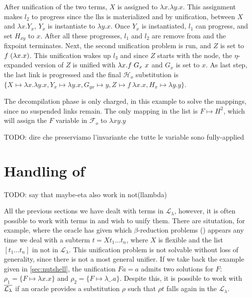 \documentclass[sigconf,natbib=false,review]{acmart}
\newcommand{\appsep}{\ensuremath{\textcolor{lightgray}{\cdot}}}
\newcommand{\llambda}{\ensuremath{\mathcal{L}_\lambda}\xspace}
\newcommand{\Fo}{\ensuremath{\mathcal{F}_{\!o}\xspace}} %
\newcommand{\Ho}{\ensuremath{\mathcal{H}_o}\xspace}
\newcommand{\mapping}[3]{\ensuremath{#1 \mapsto #2^#3}}
\newcommand{\lhs}{\ensuremath{\mathrm{lhs}}\xspace}
\begin{document}
After unification of the two terms, $X$ is assigned to $\lambda x.\lambda y.x$.
This assignment makes $l_2$ to progress since the \lhs is materialized and by
unification, between $X$ and $\lambda x.Y_{x}$, $Y_x$ is instantiate to $\lambda
y.x$. Once $Y_x$ is instantiated, $l_1$ can progress, and set $H_{xy}$ to $x$.
After all these progresses, $l_1$ and $l_2$ are remove from \linkStore and the
 fixpoint terminates. Next, the second unification problem is
run, and $Z$ is set to $f\appsep(\lambda x.x)$. This unification wakes up $l_3$
and since $Z$ starts with the  node, the $\eta$-expanded version of
$Z$ is unified with $\lambda x.f \appsep G_{x}~x$ and $G_x$ is set to $x$.
As last step, the last link is progressed and the final \Ho substitution is
$\{X _{} \mapsto \lambda x.\lambda y.x, Y _{x} \mapsto \lambda y.x, 
G _{yx} \mapsto y, Z _{} \mapsto f~\lambda x.x, 
H _{x} \mapsto \lambda y.y\}$.

The decompilation phase is only charged, in this example to solve the mappings,
since no suspended links remain. The only mapping in the list is
\mapping{F}{H}{2}, which will assign the $F$ variable in \Fo{} to $\lambda xy.y$

TODO: dire che preserviamo l'invariante che tutte le variable sono fully-applied
  
\section{Handling of \maybebeta}\label{sec:beta}

TODO: say that maybe-eta also work in not(llambda)


All the previous sections we have dealt with terms in \llambda, however, it is
often possible to work with terms in \maybebeta and wish to unify them. There
are situtation, for example, where the oracle has given  which $\beta$-reduction problems (\maybebeta) appears any
time we deal with a subterm $t = X t_1 \dots t_n$, where $X$ is flexible and the
list $[t_1 \dots t_n]$ in not in \llambda. This unification problem is not
solvable without loss of generality, since there is not a most general unifier.
If we take back the example given in \cref{sec:nutshell}, the unification $F a =
a$ admits two solutions for $F$: $\rho_1 = \{F \mapsto \lambda x.x\}$ and
$\rho_2 = \{F \mapsto \lambda \_.a\}$. Despite this, it is possible to work with
$\maybebeta$ if an oracle provides a substitution $\rho$ such that $\rho t$
falls again in the \llambda.
\end{document}
